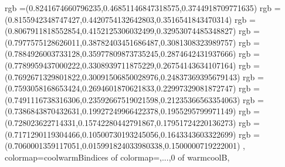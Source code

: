 {{rgb =(0.8241674660796235,0.46851146847318575,0.3744918709771635)
rgb =(0.8155942348747427,0.4420754132642803,0.3516541843470314)
rgb =(0.8067911818552854,0.4152125306032499,0.32953074485348827)
rgb =(0.7977575128626011,0.38782403451686487,0.3081308323989757)
rgb =(0.7884926003733128,0.35977809873735245,0.2874642431937666)
rgb =(0.7789959437000222,0.3308939711875229,0.26754143634107164)
rgb =(0.7692671329801822,0.30091506850028976,0.24837369395679143)
rgb =(0.7593058168653424,0.2694601870621833,0.22997329081872747)
rgb =(0.7491116738316306,0.23592667519021598,0.21235366563354063)
rgb =(0.7386843870432631,0.19927249966422378,0.1955295799971149)
rgb =(0.728023622714331,0.15742280442791867,0.17951724220136273)
rgb =(0.7171290119304466,0.10500730193245056,0.1643343603322699)
rgb =(0.7060001359117051,0.015991824033980338,0.1500000719222001)
},
colormap={coolwarmB}{indices of colormap={,...,0 of warmcoolB}},
}




